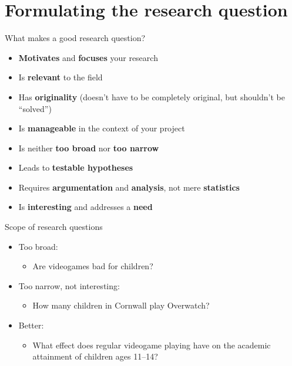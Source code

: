 \part{Formulating the research question}
\frame{\partpage}

\begin{frame}{What makes a good research question?}
	\begin{itemize}
		\pause\item \textbf{Motivates} and \textbf{focuses} your research
		\pause\item Is \textbf{relevant} to the field
		\pause\item Has \textbf{originality} (doesn't have to be completely original, but shouldn't be ``solved'')
		\pause\item Is \textbf{manageable} in the context of your project
		\pause\item Is neither \textbf{too broad} nor \textbf{too narrow}
		\pause\item Leads to \textbf{testable hypotheses}
		\pause\item Requires \textbf{argumentation} and \textbf{analysis}, not mere \textbf{statistics}
		\pause\item Is \textbf{interesting} and addresses a \textbf{need}
	\end{itemize}
\end{frame}

\begin{frame}{Scope of research questions}
	\begin{itemize}
		\pause\item Too broad:
			\begin{itemize}
				\item Are videogames bad for children?
			\end{itemize}
		\pause\item Too narrow, not interesting:
			\begin{itemize}
				\item How many children in Cornwall play Overwatch?
			\end{itemize}
		\pause\item Better:
			\begin{itemize}
				\item What effect does regular videogame playing have on the academic attainment of
					children ages 11--14?
			\end{itemize}
	\end{itemize}
\end{frame}

